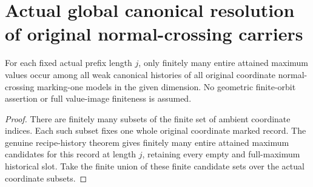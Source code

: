 \section{Actual global canonical resolution of original normal-crossing carriers}

\begin{theorem}
\label{hir:general-nc-finite-entire-prefix-maximum-candidates}
\leanok
For each fixed actual prefix length $j$, only finitely many entire
attained maximum values occur among all weak canonical histories of
all original coordinate normal-crossing marking-one models in the
given dimension. No geometric finite-orbit assertion or full value-image
finiteness is assumed.
\end{theorem}
\begin{proof}
There are finitely many subsets of the finite set of ambient coordinate
indices. Each such subset fixes one whole original coordinate marked
record. The genuine recipe-history theorem gives finitely many entire
attained maximum candidates for this record at length $j$, retaining
every empty and full-maximum historical slot. Take the finite union of
these finite candidate sets over the actual coordinate subsets.
\end{proof}

